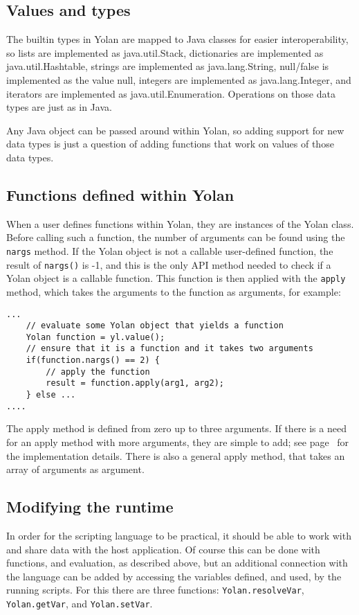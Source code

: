 \documentclass[11pt]{report}
\begin{document}
\subsection{Values and types}
The builtin types in Yolan are mapped to Java classes for easier interoperability,
so lists are implemented as java.util.Stack, dictionaries are implemented as java.util.Hashtable, strings are implemented as java.lang.String, null/false is implemented as the value null, integers are implemented as java.lang.Integer, and iterators are implemented as java.util.Enumeration. 
Operations on those data types are just as in Java.

Any Java object can be passed around within Yolan, so adding support for new data types is just a question of adding functions that work on values of those data types.

\subsection{Functions defined within Yolan}
When a user defines functions within Yolan, they are instances of the Yolan class. 
Before calling such a function, the number of arguments can be found using the \verb|nargs| method.
If the Yolan object is not a callable user-defined function, the result of \verb|nargs()| is -1, and this is the only API method needed to check if a Yolan object is a callable function.
This function is then applied with the \verb|apply| method, which takes the arguments to the function as arguments, for example:
\begin{lstlisting}
...
    // evaluate some Yolan object that yields a function
    Yolan function = yl.value();
    // ensure that it is a function and it takes two arguments
    if(function.nargs() == 2) {
        // apply the function 
        result = function.apply(arg1, arg2);
    } else ...
....
\end{lstlisting}
The apply method is defined from zero up to three arguments. If there is a need for an apply method with more arguments, they are simple to add; see page~\pageref{source-yolan-apply} for the implementation details. There is also a general apply method, that takes an array of arguments as argument.

\subsection{Modifying the runtime}

In order for the scripting language to be practical, it should be able to work with and share data with the host application. 
Of course this can be done with functions, and evaluation, as described above, but an additional connection with the language can be added by accessing the variables defined, and used, by the running scripts.
For this there are three functions: \verb|Yolan.resolveVar|, \verb|Yolan.getVar|, and \verb|Yolan.setVar|.
\end{document}

